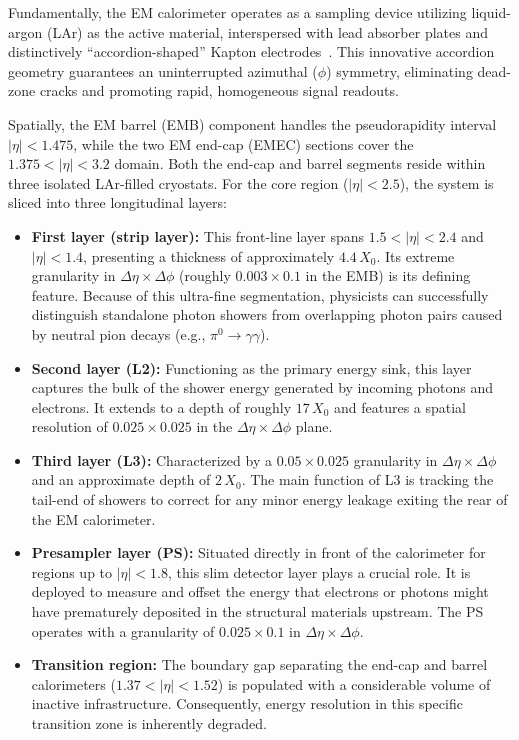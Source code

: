 Fundamentally, the EM calorimeter operates as a sampling device utilizing liquid-argon (LAr) as the active material, interspersed with lead absorber plates and distinctively ``accordion-shaped'' Kapton electrodes~\cite{ATLAS-TDR-04}. This innovative accordion geometry guarantees an uninterrupted azimuthal ($\phi$) symmetry, eliminating dead-zone cracks and promoting rapid, homogeneous signal readouts.

Spatially, the EM barrel (EMB) component handles the pseudorapidity interval $|\eta| < 1.475$, while the two EM end-cap (EMEC) sections cover the $1.375 < |\eta| < 3.2$ domain. Both the end-cap and barrel segments reside within three isolated LAr-filled cryostats. For the core region ($|\eta| < 2.5$), the system is sliced into three longitudinal layers:

\begin{itemize}

\item \textbf{First layer (strip layer):}  
This front-line layer spans $1.5 < |\eta| < 2.4$ and $|\eta| < 1.4$, presenting a thickness of approximately $4.4\,X_0$.  
Its extreme granularity in $\Delta\eta \times \Delta\phi$ (roughly $0.003 \times 0.1$ in the EMB) is its defining feature.  
Because of this ultra-fine segmentation, physicists can successfully distinguish standalone photon showers from overlapping photon pairs caused by neutral pion decays (e.g., $\pi^0 \rightarrow \gamma\gamma$).

\item \textbf{Second layer (L2):}  
Functioning as the primary energy sink, this layer captures the bulk of the shower energy generated by incoming photons and electrons.  
It extends to a depth of roughly $17\,X_0$ and features a spatial resolution of $0.025 \times 0.025$ in the $\Delta\eta \times \Delta\phi$ plane.

\item \textbf{Third layer (L3):}  
Characterized by a $0.05 \times 0.025$ granularity in $\Delta\eta \times \Delta\phi$ and an approximate depth of $2\,X_0$.  
The main function of L3 is tracking the tail-end of showers to correct for any minor energy leakage exiting the rear of the EM calorimeter.

\item \textbf{Presampler layer (PS):}  
Situated directly in front of the calorimeter for regions up to $|\eta| < 1.8$, this slim detector layer plays a crucial role.  
It is deployed to measure and offset the energy that electrons or photons might have prematurely deposited in the structural materials upstream.  
The PS operates with a granularity of $0.025 \times 0.1$ in $\Delta\eta \times \Delta\phi$.

\item \textbf{Transition region:}  
The boundary gap separating the end-cap and barrel calorimeters ($1.37 < |\eta| < 1.52$) is populated with a considerable volume of inactive infrastructure. Consequently, energy resolution in this specific transition zone is inherently degraded.

\end{itemize}
